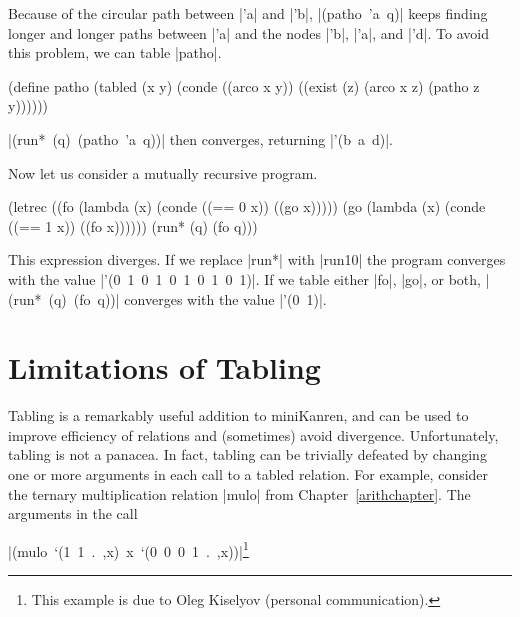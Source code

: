 \wspace

\noindent Because of the circular path between \scheme|'a| and
\scheme|'b|, \mbox{\scheme|(patho 'a q)|} keeps finding longer and
longer paths between \scheme|'a| and the nodes \scheme|'b|, \scheme|'a|,
and \scheme|'d|.  To avoid this problem, we can table
\scheme|patho|.

\schemedisplayspace
\begin{schemedisplay}
(define patho
  (tabled (x y)
    (conde
      ((arco x y))
      ((exist (z)
         (arco x z)
         (patho z y))))))
\end{schemedisplay}

\noindent \mbox{\scheme|(run* (q) (patho 'a q))|} then converges,
returning \mbox{\scheme|'(b a d)|}.

Now let us consider a mutually recursive program.

\schemedisplayspace
\begin{schemedisplay}
(letrec ((fo (lambda (x)
               (conde
                 ((== 0 x))
                 ((go x)))))
         (go (lambda (x)
               (conde
                 ((== 1 x))
                 ((fo x))))))
  (run* (q) (fo q)))
\end{schemedisplay}

\noindent This expression diverges.  If we replace
\scheme|run*| with \scheme|run10| the program converges with the value
\mbox{\scheme|'(0 1 0 1 0 1 0 1 0 1)|}.  If we table either
\scheme|fo|, \scheme|go|, or both, \mbox{\scheme|(run* (q) (fo q))|}
converges with the value \mbox{\scheme|'(0 1)|}.


\section{Limitations of Tabling}\label{tablinglimitations}

Tabling is a remarkably useful addition to miniKanren, and can be
used to improve efficiency of relations and
(sometimes) avoid divergence.  Unfortunately, tabling is not a
panacea.  In fact, tabling can be trivially defeated by changing one
or more arguments in each call to a tabled relation.  For example,
consider the ternary multiplication relation \scheme|mulo| from
Chapter~\ref{arithchapter}.  The arguments in the call

\wspace

\noindent
\mbox{\scheme|(mulo `(1 1 . ,x) x `(0 0 0 1 . ,x))|}\footnote{This example is due to Oleg
  Kiselyov (personal communication).}

